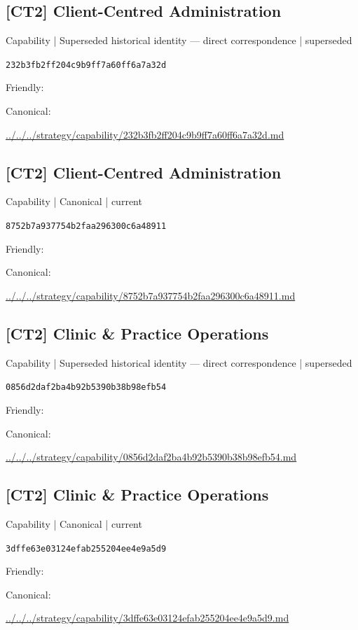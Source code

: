 \documentclass[10pt,a4paper]{article}
\begin{document}
\subsection*{[CT2] Client-Centred Administration}
{\small Capability | Superseded historical identity — direct correspondence | superseded}\par
\texttt{232b3fb2ff204c9b9ff7a60ff6a7a32d}\par
Friendly: \par
Canonical: \par
{\footnotesize\url{../../../strategy/capability/232b3fb2ff204c9b9ff7a60ff6a7a32d.md}}\par
\subsection*{[CT2] Client-Centred Administration}
{\small Capability | Canonical | current}\par
\texttt{8752b7a937754b2faa296300c6a48911}\par
Friendly: \par
Canonical: \par
{\footnotesize\url{../../../strategy/capability/8752b7a937754b2faa296300c6a48911.md}}\par
\subsection*{[CT2] Clinic \& Practice Operations}
{\small Capability | Superseded historical identity — direct correspondence | superseded}\par
\texttt{0856d2daf2ba4b92b5390b38b98efb54}\par
Friendly: \par
Canonical: \par
{\footnotesize\url{../../../strategy/capability/0856d2daf2ba4b92b5390b38b98efb54.md}}\par
\subsection*{[CT2] Clinic \& Practice Operations}
{\small Capability | Canonical | current}\par
\texttt{3dffe63e03124efab255204ee4e9a5d9}\par
Friendly: \par
Canonical: \par
{\footnotesize\url{../../../strategy/capability/3dffe63e03124efab255204ee4e9a5d9.md}}\par
\end{document}
